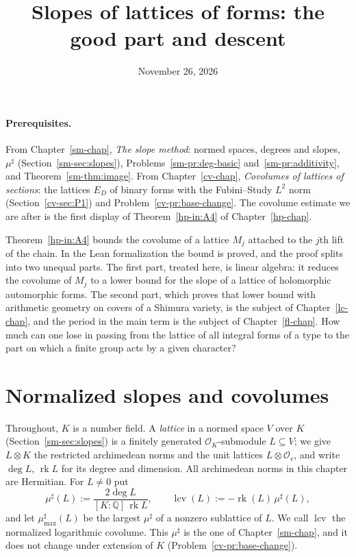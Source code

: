 \documentclass[reqno]{amsart}
\title{Slopes of lattices of forms: the good part and descent}
\author{}
\date{November 26, 2026}
\newcounter{chap}
\theoremstyle{definition}
\theoremstyle{plain}
\theoremstyle{remark}
\newcommand{\Q}{\mathbb Q}
\newcommand{\Oc}{\mathcal O}
\newcommand{\lcv}{\operatorname{lcv}}
\newcommand{\rk}{\operatorname{rk}}
\newcommand{\mus}{\mu^\sharp}
\newcommand{\musmax}{\mu^\sharp_{\max}}
\begin{document}
\maketitle
{}\label{chap}

\paragraph{Prerequisites.}
From Chapter~\ref{sm-chap}, \emph{The slope method}: normed spaces, degrees and slopes, \(\mus\) (Section~\ref{sm-sec:slopes}), Problems~\ref{sm-pr:deg-basic} and~\ref{sm-pr:additivity}, and Theorem~\ref{sm-thm:image}.  From Chapter~\ref{cv-chap}, \emph{Covolumes of lattices of sections}: the lattices \(E_D\) of binary forms with the Fubini--Study \(L^2\) norm (Section~\ref{cv-sec:P1}) and Problem~\ref{cv-pr:base-change}.  The covolume estimate we are after is the first display of Theorem~\ref{hp-in:A4} of Chapter~\ref{hp-chap}.

Theorem~\ref{hp-in:A4} bounds the covolume of a lattice \(M_j\) attached to the \(j\)th lift of the chain.  In the Lean formalization \cite{Lean} the bound is proved, and the proof splits into two unequal parts.  The first part, treated here, is linear algebra: it reduces the covolume of \(M_j\) to a lower bound for the slope of a lattice of holomorphic automorphic forms.  The second part, which proves that lower bound with arithmetic geometry on covers of a Shimura variety, is the subject of Chapter~\ref{lc-chap}, and the period in the main term is the subject of Chapter~\ref{fl-chap}.  How much can one lose in passing from the lattice of all integral forms of a type to the part on which a finite group acts by a given character?

\section{Normalized slopes and covolumes}\label{sec:lcv}

Throughout, \(K\) is a number field.  A \emph{lattice} in a normed space \(V\) over \(K\) (Section~\ref{sm-sec:slopes}) is a finitely generated \(\Oc_K\)-submodule \(L \subseteq V\); we give \(L \otimes K\) the restricted archimedean norms and the unit lattices \(L \otimes \Oc_v\), and write \(\deg L\), \(\rk L\) for its degree and dimension.  All archimedean norms in this chapter are Hermitian.  For \(L \ne 0\) put
\[
  \mus(L) := \frac{2\deg L}{[K:\Q]\,\rk L} , \qquad \lcv(L) := -\rk(L)\,\mus(L) ,
\]
and let \(\musmax(L)\) be the largest \(\mus\) of a nonzero sublattice of \(L\).  We call \(\lcv\) the normalized logarithmic covolume.  This \(\mus\) is the one of Chapter~\ref{sm-chap}, and it does not change under extension of \(K\) (Problem~\ref{cv-pr:base-change}).
\end{document}
